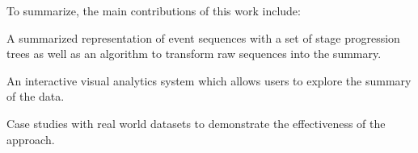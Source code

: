 To summarize, the main contributions of this work include: 
\begin{compactitem}
	\item A summarized representation of event sequences with a set of stage progression trees as well as an algorithm to transform raw sequences into the summary.
	\item An interactive visual analytics system which allows users to explore the summary of the data.
	\item Case studies with real world datasets to demonstrate the effectiveness of the approach.
\end{compactitem}




